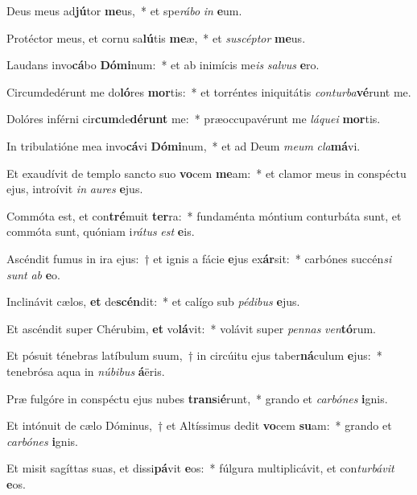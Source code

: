 \item Deus meus ad\textbf{jú}tor \textbf{me}us,~* et spe\textit{rá}\textit{bo} \textit{in} \textbf{e}um.
\item Protéctor meus, et cornu sa\textbf{lú}tis \textbf{me}æ,~* et \textit{su}\textit{scép}\textit{tor} \textbf{me}us.
\item Laudans invo\textbf{cá}bo \textbf{Dó}\textbf{mi}num:~* et ab inimícis me\textit{is} \textit{sal}\textit{vus} \textbf{e}ro.
\item Circumdedérunt me do\textbf{ló}res \textbf{mor}tis:~* et torréntes iniquitátis \textit{con}\textit{tur}\textit{ba}\textbf{vé}runt me.
\item Dolóres inférni cir\textbf{cum}de\textbf{dé}\textbf{runt} me:~* præoccupavérunt me \textit{lá}\textit{que}\textit{i} \textbf{mor}tis.
\item In tribulatióne mea invo\textbf{cá}vi \textbf{Dó}\textbf{mi}num,~* et ad Deum \textit{me}\textit{um} \textit{cla}\textbf{má}vi.
\item Et exaudívit de templo sancto suo \textbf{vo}cem \textbf{me}am:~* et clamor meus in conspéctu ejus, introívit \textit{in} \textit{au}\textit{res} \textbf{e}jus.
\item Commóta est, et con\textbf{tré}muit \textbf{ter}ra:~* fundaménta móntium conturbáta sunt, et commóta sunt, quóniam i\textit{rá}\textit{tus} \textit{est} \textbf{e}is.
\item Ascéndit fumus in ira ejus:~† et ignis a fácie \textbf{e}jus ex\textbf{ár}sit:~* carbónes succén\textit{si} \textit{sunt} \textit{ab} \textbf{e}o.
\item Inclinávit cælos, \textbf{et} de\textbf{scén}dit:~* et calígo sub \textit{pé}\textit{di}\textit{bus} \textbf{e}jus.
\item Et ascéndit super Chérubim, \textbf{et} vo\textbf{lá}vit:~* volávit super \textit{pen}\textit{nas} \textit{ven}\textbf{tó}rum.
\item Et pósuit ténebras latíbulum suum,~† in circúitu ejus taber\textbf{ná}culum \textbf{e}jus:~* tenebrósa aqua in \textit{nú}\textit{bi}\textit{bus} \textbf{á}ëris.
\item Præ fulgóre in conspéctu ejus nubes \textbf{trans}i\textbf{é}runt,~* grando et \textit{car}\textit{bó}\textit{nes} \textbf{i}gnis.
\item Et intónuit de cælo Dóminus,~† et Altíssimus dedit \textbf{vo}cem \textbf{su}am:~* grando et \textit{car}\textit{bó}\textit{nes} \textbf{i}gnis.
\item Et misit sagíttas suas, et dissi\textbf{pá}vit \textbf{e}os:~* fúlgura multiplicávit, et con\textit{tur}\textit{bá}\textit{vit} \textbf{e}os.
